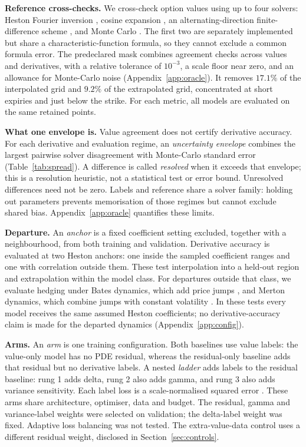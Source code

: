 \documentclass{article}
\begin{document}
\textbf{Reference cross-checks.} We cross-check option values using
up to four solvers: Heston Fourier inversion
\citep{heston1993closed,albrecher2007little}, cosine expansion
\citep{fang2008novel}, an alternating-direction finite-difference scheme
\citep{craig1988alternating}, and Monte Carlo \citep{lord2010comparison}.
The first two are separately implemented but share a characteristic-function
formula, so they cannot exclude a common formula error. The predeclared mask combines
agreement checks across values and derivatives, with a relative tolerance of
$10^{-3}$, a scale floor near zero, and an allowance for Monte-Carlo noise
(Appendix~\ref{app:oracle}). It removes $17.1\%$ of the interpolated grid
and $9.2\%$ of the extrapolated grid, concentrated at short expiries and just below
the strike. For each metric, all models are evaluated on the same retained points.

\textbf{What one envelope is.} Value agreement does not certify derivative accuracy. For each derivative and
evaluation regime, an \emph{uncertainty envelope} combines the largest pairwise
solver disagreement with Monte-Carlo standard error (Table~\ref{tab:spread}). A
difference is called \emph{resolved} when it exceeds that envelope; this is a
resolution heuristic, not a statistical test or error bound. Unresolved
differences need not be zero. Labels and reference share a
solver family: holding out parameters prevents memorisation of those regimes but
cannot exclude shared bias. Appendix~\ref{app:oracle} quantifies these limits.

\textbf{Departure.} An \emph{anchor} is a fixed coefficient setting
excluded, together with a neighbourhood, from both training and validation.
Derivative accuracy is evaluated at two Heston anchors: one inside the sampled
coefficient ranges and one with correlation outside them. These test interpolation
into a held-out region and extrapolation within the model class. For departures
outside that class, we evaluate hedging under Bates dynamics, which add price jumps
\citep{bates1996jumps}, and Merton dynamics, which combine jumps with constant
volatility \citep{merton1976option}. In these tests every model receives the same
assumed Heston coefficients; no derivative-accuracy claim is made for the departed
dynamics (Appendix~\ref{app:config}).

\textbf{Arms.} An \emph{arm} is one training configuration.
Both baselines use value labels: the value-only model has no PDE residual, whereas
the residual-only baseline adds that residual but no derivative labels. A nested
\emph{ladder} adds labels to the residual baseline: rung 1 adds delta, rung 2 also
adds gamma, and rung 3 also adds variance sensitivity. Each label loss is a
scale-normalised squared error \citep{huge2020differential}. These arms share
architecture, optimiser, data and budget. The residual, gamma and variance-label
weights were selected on validation; the delta-label weight was fixed. Adaptive
loss balancing was not tested. The extra-value-data control
uses a different residual weight, disclosed in Section~\ref{sec:controls}.
\end{document}
